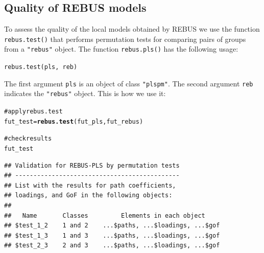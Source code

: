 \documentclass[12pt]{book}\usepackage{graphicx, color}
\makeatletter
\newcommand{\hlfunctioncall}[1]{\textcolor[rgb]{0.501960784313725,0,0.329411764705882}{\textbf{#1}}}%
\newcommand{\hlcomment}[1]{\textcolor[rgb]{0.180392156862745,0.6,0.341176470588235}{#1}}%
\newenvironment{kframe}{%
 \def\at@end@of@kframe{}%
 \ifinner\ifhmode%
  \def\at@end@of@kframe{\end{minipage}}%
  \begin{minipage}{\columnwidth}%
 \fi\fi%
 \def\FrameCommand##1{\hskip\@totalleftmargin \hskip-\fboxsep
 \colorbox{shadecolor}{##1}\hskip-\fboxsep
     \hskip-\linewidth \hskip-\@totalleftmargin \hskip\columnwidth}%
 \MakeFramed {\advance\hsize-\width
   \@totalleftmargin\z@ \linewidth\hsize
   \@setminipage}}%
 {\par\unskip\endMakeFramed%
 \at@end@of@kframe}
\newenvironment{knitrout}{}{} %
\newcommand{\code}[1]{\texttt{#1}}
\makeatother
\begin{document}
\subsection{Quality of REBUS models}
To assess the quality of the local models obtained by REBUS we use the function \code{rebus.test()} that performs permutation tests for comparing pairs of groups from a \code{"rebus"} object. The
function \code{rebus.pls()} has the following usage:

\texttt{rebus.test(pls, reb)}

The first argument \code{pls} is an object of class \code{"plspm"}. The second argument \code{reb} indicates the \code{"rebus"} object. This is how we use it:
\begin{knitrout}
\color{fgcolor}\begin{kframe}
\begin{alltt}
\hlcomment{# apply rebus.test}
fut_test = \hlfunctioncall{rebus.test}(fut_pls, fut_rebus)

\hlcomment{# check results}
fut_test
\end{alltt}
\begin{verbatim}
## Validation for REBUS-PLS by permutation tests 
## --------------------------------------------- 
## List with the results for path coefficients,  
## loadings, and GoF in the following objects: 
## 
##   Name       Classes 	    Elements in each object 
## $test_1_2    1 and 2    ...$paths, ...$loadings, ...$gof 
## $test_1_3    1 and 3    ...$paths, ...$loadings, ...$gof 
## $test_2_3    2 and 3    ...$paths, ...$loadings, ...$gof
\end{verbatim}
\end{kframe}
\end{knitrout}
\end{document}
